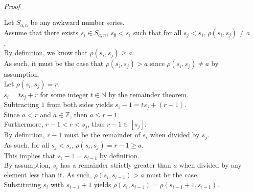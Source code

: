 \documentclass[a4paper,12pt]{article}
\begin{document}
\noindent \\
\textit{Proof}

\noindent Let $S_{a, n}$ be any awkward number series.\\

\noindent Assume that there exists $s_i \in S_{a, n}$, $s_0 < s_i$ such that for all $s_j < s_i$, $\rho(s_i, s_j) \neq a$.\\

\noindent \hyperlink{definition:awkward_number_series}{By definition}, we know that $\rho(s_i, s_j) \geq a$.\\

\noindent As such, it must be the case that $\rho(s_i, s_j) > a$ since $\rho(s_i, s_j) \neq a$ by assumption.\\

\noindent Let $\rho(s_i, s_j) = r$.\\

\noindent $s_i = ts_j + r$ for some integer $t \in \mathbb{N}$ by \hyperlink{theorem:remainder_theorem}{the remainder theorem}.\\

\noindent Subtracting $1$ from both sides yields $s_i - 1 = ts_j + (r - 1)$.\\

\noindent Since $a < r$ and $a \in \mathbb{Z}$, then $a \leq r - 1$.\\

\noindent Furthermore, $r - 1 < r < s_j$, thus $r - 1 \in [s_j]$.\\

\noindent \hyperlink{theorem:remainder_theorem}{By definition}, $r - 1$ must be the remainder of $s_i$ when divided by $s_j$.\\

\noindent As such, for all $s_j < s_i$, $\rho(s_i, s_j) = r - 1 \geq a$.\\

\noindent This implies that $s_i - 1 = s_{i - 1}$ \hyperlink{definition:awkward_number_series}{by definition}.\\

\noindent By assumption, $s_i$ has a remainder strictly greater than $a$ when divided by any element less than it. As such, $\rho(s_i, s_{i - 1}) > a$ must be the case.\\

\noindent Substituting $s_i$ with $s_{i - 1} + 1$ yields $\rho(s_i, s_{i - 1}) = \rho(s_{i - 1} + 1, s_{i - 1})$.\\
\end{document}
